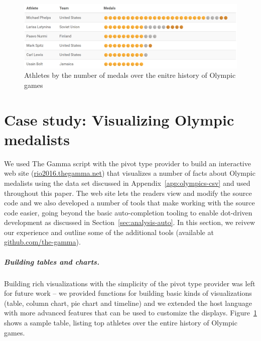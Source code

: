 \documentclass[a4paper,UKenglish]{lipics-v2016}
\theoremstyle{plain}
\theoremstyle{definition}
\begin{document}

\begin{figure}[b]
\begin{center}
\includegraphics[scale=0.30,trim=0mm 0mm 0mm 0mm,clip]{images/table.png} %
\end{center}
\caption{Athletes by the number of medals over the enitre history of Olympic games}
\label{fig:case-table}
\end{figure}


\section{Case study: Visualizing Olympic medalists}
\label{sec:impl}

We used The Gamma script with the pivot type provider to build an interactive web site 
(\url{rio2016.thegamma.net}) that visualizes a number of facts about Olympic medalists 
using the data set discussed in Appendix~\ref{app:olympics-csv} and used throughout this paper.
The web site lets the readers view and modify the source code and we also developed a number of
tools that make working with the source code easier, going beyond the basic auto-completion tooling
to enable dot-driven development as discussed in Section~\ref{sec:analysis-auto}. In this section,
we reivew our experience and outline some of the additional tools (available at 
\url{github.com/the-gamma}).

\subparagraph{Building tables and charts.} 
Building rich visualizations with the simplicity of the pivot type provider was left for future
work -- we provided functions for building basic kinds of visualizations (table, column chart, 
pie chart and timeline) and we extended the host language with more advanced features that can
be used to customize the displays. Figure~\ref{fig:case-table} shows a sample table, listing
top athletes over the entire history of Olympic games.
\end{document}
